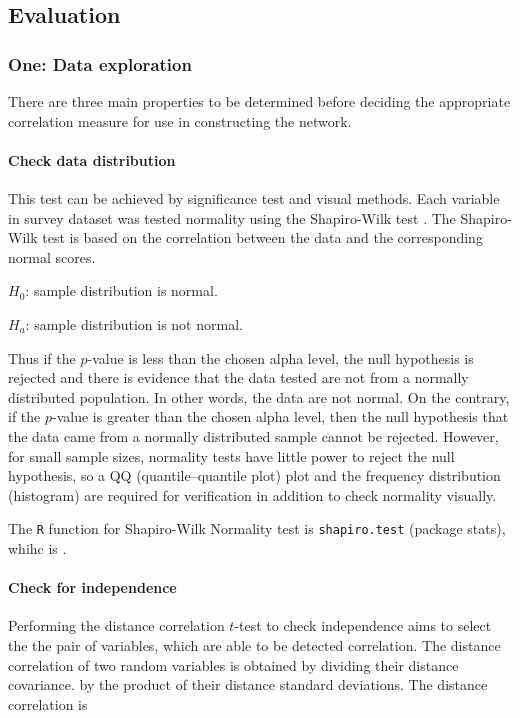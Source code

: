 \documentclass[a4paper]{article}
\begin{document}
\subsection*{Evaluation}

\subsubsection*{One: Data exploration}
There are three main properties to be determined before deciding the appropriate correlation measure for use in constructing the network. 

\paragraph{Check data distribution} This test can be achieved by significance test and visual methods. Each variable in survey dataset was tested normality using the Shapiro-Wilk test \citep{ghasemi2012normality}. The Shapiro-Wilk test is based on the correlation between the data and the corresponding normal scores.

$H_{0}$: sample distribution is normal.

$H_{a}$: sample distribution is not normal.

Thus if the $p$-value is less than the chosen alpha level, the null hypothesis is rejected and there is evidence that the data tested are not from a normally distributed population. In other words, the data are not normal. On the contrary, if the $p$-value is greater than the chosen alpha level, then the null hypothesis that the data came from a normally distributed sample   cannot be rejected. However, for small sample sizes, normality tests have little power to reject the null hypothesis, so a QQ (quantile--quantile plot) plot and the frequency distribution (histogram) are required for verification in addition to check normality visually.

The \texttt{R} function for Shapiro-Wilk Normality test is \texttt{shapiro.test} (package stats), whihc is \citep{R:2014}.

\paragraph{Check for independence} Performing the distance correlation $t$-test\citep{szekely2007measuring} to check independence aims to select the the pair of variables, which are able to be detected correlation. The distance correlation of two random variables is obtained by dividing their distance covariance. by the product of their distance standard deviations. The distance correlation is
\end{document}
